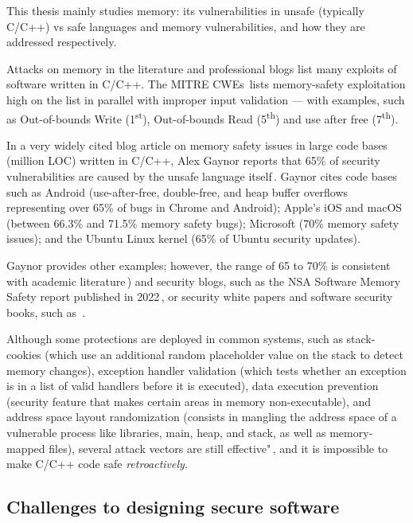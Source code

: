 \documentclass[nomenclature, english, bibtex]{kththesis}
\begin{document}

This thesis mainly studies memory: its vulnerabilities in unsafe (typically C/C++) vs safe languages and memory vulnerabilities, and how they are addressed respectively.  

Attacks on memory in the literature and professional blogs list many exploits of software written in C/C++. The MITRE \glspl{CWE}\,\cite{noauthor_cwe_nodate} lists \gls{memory-safety} exploitation high on the list in parallel with improper input validation --- with examples, such as Out-of-bounds Write (1\textsuperscript{st}), Out-of-bounds Read (5\textsuperscript{th}) and use after free (7\textsuperscript{th}).

In a very widely cited blog article on memory safety issues in large code bases (million \gls{LOC}) written in C/C++, Alex Gaynor reports that 65\% of security vulnerabilities are caused by the unsafe language itself\,\cite{gaynor_what_2020}. Gaynor cites code bases such as Android (use-after-free, double-free, and heap buffer overflows representing over 65\% of bugs in Chrome and Android); Apple's iOS and macOS (between 66.3\% and 71.5\% memory safety bugs); Microsoft (70\%  memory safety issues); and the Ubuntu Linux kernel (65\% of Ubuntu security updates).

Gaynor provides other examples; however, the range of 65 to 70\% is consistent with academic literature\,\cite{mergendahl_cross-language_2022,scherer_engineering_2021, li_improving_2014}) and security blogs, such as the \gls{NSA} Software Memory Safety report published in 2022\,\cite{noauthor_nsa_2022}, or security white papers and software security books, such as~\cite{chapman_adacore_2018}.

Although some protections are deployed in common systems, such as stack-cookies (which use an additional random placeholder value on the stack to detect memory changes), exception handler validation (which tests whether an exception is in a list
of valid handlers before it is executed), data execution prevention (security feature that makes certain areas in memory non-executable), and address space layout randomization (consists in mangling the address space of a vulnerable process like libraries, main, heap, and stack, as well as memory-mapped files), several attack vectors are still effective"\,\cite{szekeres_sok_2013}, and it is impossible to make C/C++ code safe \emph{retroactively}. 

\subsection{Challenges to designing secure software}
\end{document}
